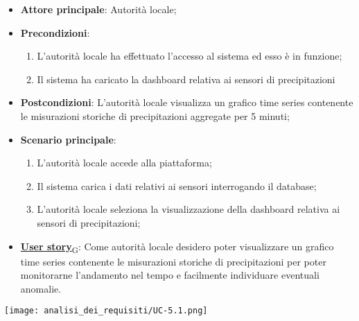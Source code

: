 \begin{itemize}
	\item \textbf{Attore principale}: Autorità locale;
	\item \textbf{Precondizioni}:
	      \begin{enumerate}
		      \item L'autorità locale ha effettuato l'accesso al sistema ed esso è in funzione;
		      \item Il sistema ha caricato la dashboard relativa ai sensori di precipitazioni
	      \end{enumerate}
	\item \textbf{Postcondizioni}: L'autorità locale visualizza un grafico time series contenente le misurazioni storiche
	      di precipitazioni aggregate per 5 minuti;
	\item \textbf{Scenario principale}:
	      \begin{enumerate}
		      \item L'autorità locale accede alla piattaforma;
		      \item Il sistema carica i dati relativi ai sensori interrogando il database;
		      \item L'autorità locale seleziona la visualizzazione della dashboard relativa ai sensori di precipitazioni;
	      \end{enumerate}
	\item \href{https://7last.github.io/docs/rtb/documentazione-interna/glossario\#user-story}{\textbf{User story}\textsubscript{G}}:
	      Come autorità locale desidero poter visualizzare un grafico time series contenente le misurazioni storiche
	      di precipitazioni per poter monitorarne l'andamento nel tempo e facilmente individuare eventuali anomalie.
\end{itemize}
\begin{center}
	\texttt{[image: analisi\_dei\_requisiti/UC-5.1.png]}
\end{center}

